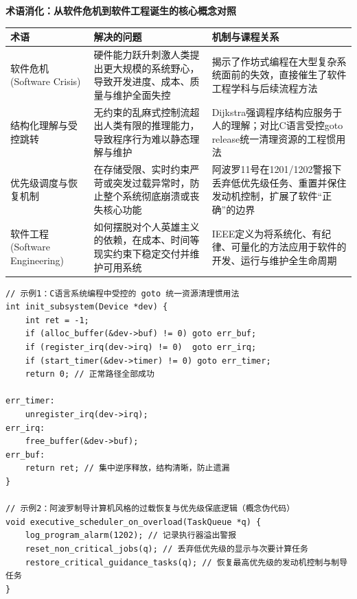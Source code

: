 \documentclass[UTF8,a4paper,11pt,fontset=fandol]{ctexart}
\begin{document}
\par{}\textbf{术语消化：从软件危机到软件工程诞生的核心概念对照}

\begin{center}\small\begin{tabularx}{\linewidth}{YYY}

\toprule

术语 & 解决的问题 & 机制与课程关系\\\midrule

软件危机 (Software Crisis) & 硬件能力跃升刺激人类提出更大规模的系统野心，导致开发进度、成本、质量与维护全面失控 & 揭示了作坊式编程在大型复杂系统面前的失效，直接催生了软件工程学科与后续流程方法\\[3pt]

结构化理解与受控跳转 & 无约束的乱麻式控制流超出人类有限的推理能力，导致程序行为难以静态理解与维护 & Dijkstra强调程序结构应服务于人的理解；对比C语言受控goto release统一清理资源的工程惯用法\\[3pt]

优先级调度与恢复机制 & 在存储受限、实时约束严苛或突发过载异常时，防止整个系统彻底崩溃或丧失核心功能 & 阿波罗11号在1201/1202警报下丢弃低优先级任务、重置并保住发动机控制，扩展了软件“正确”的边界\\[3pt]

软件工程 (Software Engineering) & 如何摆脱对个人英雄主义的依赖，在成本、时间等现实约束下稳定交付并维护可用系统 & IEEE定义为将系统化、有纪律、可量化的方法应用于软件的开发、运行与维护全生命周期\\[3pt]

\bottomrule\end{tabularx}\end{center}

\begin{lstlisting}[basicstyle={\ttfamily\small\linespread{1}\selectfont},captionpos=t,caption={受控跳转与异常恢复的工程惯用法对比}]
// 示例1：C语言系统编程中受控的 goto 统一资源清理惯用法
int init_subsystem(Device *dev) {
    int ret = -1;
    if (alloc_buffer(&dev->buf) != 0) goto err_buf;
    if (register_irq(dev->irq) != 0)  goto err_irq;
    if (start_timer(&dev->timer) != 0) goto err_timer;
    return 0; // 正常路径全部成功

err_timer:
    unregister_irq(dev->irq);
err_irq:
    free_buffer(&dev->buf);
err_buf:
    return ret; // 集中逆序释放，结构清晰，防止遗漏
}

// 示例2：阿波罗制导计算机风格的过载恢复与优先级保底逻辑（概念伪代码）
void executive_scheduler_on_overload(TaskQueue *q) {
    log_program_alarm(1202); // 记录执行器溢出警报
    reset_non_critical_jobs(q); // 丢弃低优先级的显示与次要计算任务
    restore_critical_guidance_tasks(q); // 恢复最高优先级的发动机控制与制导任务
}
\end{lstlisting}
\end{document}
